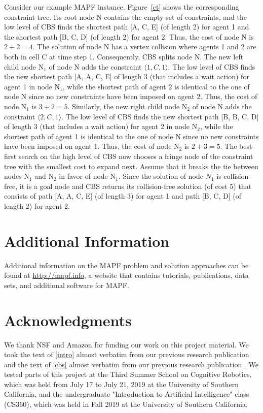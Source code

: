 \documentclass[11pt]{article}
\begin{document}
Consider our example MAPF instance. Figure~\ref{ct} shows the corresponding constraint tree. Its root node N contains the empty set of constraints, and the low level of CBS finds the shortest path [A, C, E] (of length 2) for agent 1 and the shortest path [B, C, D] (of length 2) for agent 2. Thus, the cost of node N is $2+2=4$. The solution of node N has a vertex collision where agents 1 and 2 are both in cell C at time step 1. Consequently, CBS splits node N. The new left child node N$_1$ of node N adds the constraint $\langle 1, C, 1 \rangle$. The low level of CBS finds the new shortest path [A, A, C, E] of length 3 (that includes a wait action) for agent 1 in node N$_1$, while the shortest path of agent 2 is identical to the one of node N since no new constraints have been imposed on agent 2. Thus, the cost of node N$_1$ is $3+2=5$. Similarly, the new right child node N$_2$ of node N adds the constraint $\langle 2, C, 1 \rangle$. The low level of CBS finds the new shortest path [B, B, C, D] of length 3 (that includes a wait action) for agent 2 in node N$_2$, while the shortest path of agent 1 is identical to the one of node N since no new constraints have been imposed on agent 1. Thus, the cost of node N$_2$ is $2+3=5$. The best-first search on the high level of CBS now chooses a fringe node of the constraint tree with the smallest cost to expand next. Assume that it breaks the tie between nodes N$_1$ and N$_2$ in favor of node N$_1$. Since the solution of node $N_1$ is collision-free, it is a goal node and CBS returns its collision-free solution (of cost 5) that consists of path [A, A, C, E] (of length 3) for agent 1 and path [B, C, D] (of length 2) for agent 2.

\section{Additional Information}

Additional information on the MAPF problem and solution approaches can be found at \url{http://mapf.info}, a website that contains tutorials, publications, data sets, and additional software for MAPF.

\section{Acknowledgments}

We thank NSF and Amazon for funding our work on this project material. 
We took the text of \cref{intro} almost verbatim from our previous research publication \cite{Ma17b} and the text of \cref{cbs} almost verbatim from our previous research publication \cite{Feln18}. We tested parts of this project at the Third Summer School on Cognitive Robotics, which was held from July 17 to July 21, 2019 at the University of Southern California, and the undergraduate "Introduction to Artificial Intelligence" class (CS360), which was held in Fall 2019 at the University of Southern California.



\end{document}
